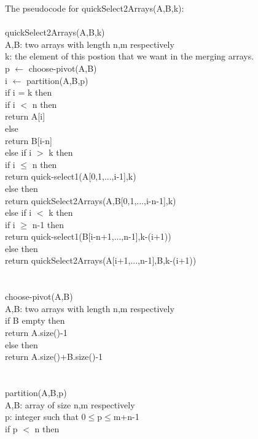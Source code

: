 \documentclass[12pt]{article}
\begin{document}
	The pseudocode for quickSelect2Arrays(A,B,k):\\
	\\
	quickSelect2Arrays(A,B,k)\\
	A,B: two arrays with length n,m respectively\\
	k: the element of this postion that we want in the merging arrays.\\
	p $\gets$ choose-pivot(A,B)\\
	i $\gets$ partition(A,B,p)\\
	if i = k then\\
	\hphantom{1111} if i $<$ n then\\
	\hphantom{11111111} return A[i]\\
	\hphantom{1111} else\\
	\hphantom{11111111} return B[i-n]\\
	else if i $>$ k then\\
	\hphantom{1111} if i $\leq$ n then\\
	\hphantom{11111111} return quick-select1(A[0,1,...,i-1],k)\\
	\hphantom{1111} else then\\
	\hphantom{11111111} return quickSelect2Arrays(A,B[0,1,...,i-n-1],k)\\
	else if i $<$ k then\\
	\hphantom{1111} if i $\geq$ n-1 then\\
	\hphantom{11111111} return quick-select1(B[i-n+1,...,n-1],k-(i+1))\\
	\hphantom{1111} else then\\
	\hphantom{11111111} return quickSelect2Arrays(A[i+1,...,n-1],B,k-(i+1))\\
	\\
	\\
	choose-pivot(A,B)\\
	A,B: two arrays with length n,m respectively\\
	if B empty then\\
	\hphantom{1111} return A.size()-1\\
	else then\\
	\hphantom{1111} return A.size()+B.size()-1\\
	\\
	\\
	partition(A,B,p)\\
	A,B: array of size n,m respectively\\
	p: integer such that 0$\leq$p$\leq$m+n-1\\
	if p $<$ n then\\
\end{document}

